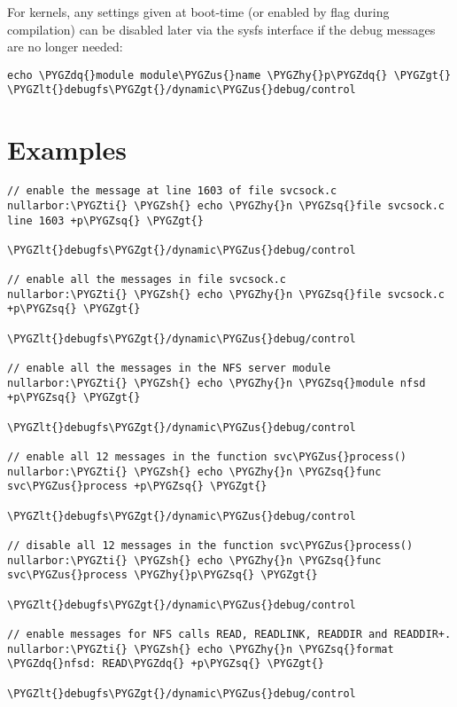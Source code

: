 \documentclass[a4paper,8pt,english]{sphinxmanual}
\def\PYGZus{\char`\_}
\def\PYGZlt{\char`\<}
\def\PYGZgt{\char`\>}
\def\PYGZsh{\char`\#}
\def\PYGZhy{\char`\-}
\def\PYGZsq{\char`\'}
\def\PYGZdq{\char`\"}
\def\PYGZti{\char`\~}
\renewcommand\PYGZsq{\textquotesingle}
\begin{document}
For  kernels, any settings given at boot-time (or
enabled by  flag during compilation) can be disabled later via
the sysfs interface if the debug messages are no longer needed:

\begin{Verbatim}[commandchars=\\\{\}]
echo \PYGZdq{}module module\PYGZus{}name \PYGZhy{}p\PYGZdq{} \PYGZgt{} \PYGZlt{}debugfs\PYGZgt{}/dynamic\PYGZus{}debug/control
\end{Verbatim}


\section{Examples}
\label{admin-guide/dynamic-debug-howto:examples}
\begin{Verbatim}[commandchars=\\\{\}]
// enable the message at line 1603 of file svcsock.c
nullarbor:\PYGZti{} \PYGZsh{} echo \PYGZhy{}n \PYGZsq{}file svcsock.c line 1603 +p\PYGZsq{} \PYGZgt{}
                              \PYGZlt{}debugfs\PYGZgt{}/dynamic\PYGZus{}debug/control

// enable all the messages in file svcsock.c
nullarbor:\PYGZti{} \PYGZsh{} echo \PYGZhy{}n \PYGZsq{}file svcsock.c +p\PYGZsq{} \PYGZgt{}
                              \PYGZlt{}debugfs\PYGZgt{}/dynamic\PYGZus{}debug/control

// enable all the messages in the NFS server module
nullarbor:\PYGZti{} \PYGZsh{} echo \PYGZhy{}n \PYGZsq{}module nfsd +p\PYGZsq{} \PYGZgt{}
                              \PYGZlt{}debugfs\PYGZgt{}/dynamic\PYGZus{}debug/control

// enable all 12 messages in the function svc\PYGZus{}process()
nullarbor:\PYGZti{} \PYGZsh{} echo \PYGZhy{}n \PYGZsq{}func svc\PYGZus{}process +p\PYGZsq{} \PYGZgt{}
                              \PYGZlt{}debugfs\PYGZgt{}/dynamic\PYGZus{}debug/control

// disable all 12 messages in the function svc\PYGZus{}process()
nullarbor:\PYGZti{} \PYGZsh{} echo \PYGZhy{}n \PYGZsq{}func svc\PYGZus{}process \PYGZhy{}p\PYGZsq{} \PYGZgt{}
                              \PYGZlt{}debugfs\PYGZgt{}/dynamic\PYGZus{}debug/control

// enable messages for NFS calls READ, READLINK, READDIR and READDIR+.
nullarbor:\PYGZti{} \PYGZsh{} echo \PYGZhy{}n \PYGZsq{}format \PYGZdq{}nfsd: READ\PYGZdq{} +p\PYGZsq{} \PYGZgt{}
                              \PYGZlt{}debugfs\PYGZgt{}/dynamic\PYGZus{}debug/control


\end{Verbatim}
\end{document}
